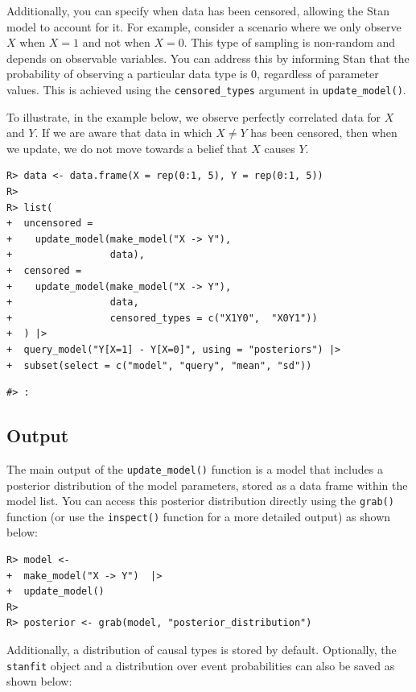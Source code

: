 \documentclass[
  11pt,
  article]{jss}
\begin{document}
Additionally, you can specify when data has been censored, allowing the
Stan model to account for it. For example, consider a scenario where we
only observe \(X\) when \(X=1\) and not when \(X=0\). This type of
sampling is non-random and depends on observable variables. You can
address this by informing Stan that the probability of observing a
particular data type is \(0\), regardless of parameter values. This is
achieved using the \texttt{censored\_types} argument in
\texttt{update\_model()}.

To illustrate, in the example below, we observe perfectly correlated
data for \(X\) and \(Y\). If we are aware that data in which
\(X \neq Y\) has been censored, then when we update, we do not move
towards a belief that \(X\) causes \(Y\).

\begin{verbatim}
R> data <- data.frame(X = rep(0:1, 5), Y = rep(0:1, 5))
R> 
R> list(
+  uncensored = 
+    update_model(make_model("X -> Y"),
+                 data),
+  censored = 
+    update_model(make_model("X -> Y"), 
+                 data, 
+                 censored_types = c("X1Y0",  "X0Y1"))
+  ) |>
+  query_model("Y[X=1] - Y[X=0]", using = "posteriors") |> 
+  subset(select = c("model", "query", "mean", "sd"))
\end{verbatim}

\begin{verbatim}
#> :
\end{verbatim}

\subsection{Output}\label{output}

The main output of the \texttt{update\_model()} function is a model that
includes a posterior distribution of the model parameters, stored as a
data frame within the model list. You can access this posterior
distribution directly using the \texttt{grab()} function (or use the
\texttt{inspect()} function for a more detailed output) as shown below:

\begin{verbatim}
R> model <-
+  make_model("X -> Y")  |> 
+  update_model()
R> 
R> posterior <- grab(model, "posterior_distribution")  
\end{verbatim}

Additionally, a distribution of causal types is stored by default.
Optionally, the \texttt{stanfit} object and a distribution over event
probabilities can also be saved as shown below:
\end{document}
